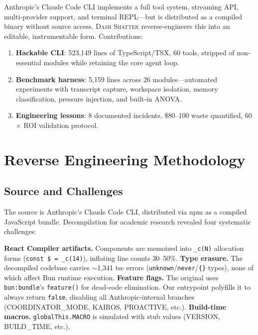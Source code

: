 \documentclass[10pt,a4paper]{article}
\begin{document}
Anthropic's Claude Code CLI implements a full tool system, streaming API, multi-provider support, and terminal REPL---but is distributed as a compiled binary without source access. \textsc{Dash Shatter} reverse-engineers this into an editable, instrumentable form. Contributions:
\begin{enumerate}[leftmargin=1.5em,itemsep=1pt,topsep=2pt]
  \item \textbf{Hackable CLI}: 523{,}149 lines of TypeScript/TSX, 60 tools, stripped of non-essential modules while retaining the core agent loop.
  \item \textbf{Benchmark harness}: 5{,}159 lines across 26 modules---automated experiments with transcript capture, workspace isolation, memory classification, pressure injection, and built-in ANOVA.
  \item \textbf{Engineering lessons}: 8 documented incidents, \$80--100 waste quantified, 60$\times$ ROI validation protocol.
\end{enumerate}

\section{Reverse Engineering Methodology}\label{sec:reverse}

\subsection{Source and Challenges}

The source is Anthropic's Claude Code CLI, distributed via npm as a compiled JavaScript bundle. Decompilation for academic research revealed four systematic challenges:

\textbf{React Compiler artifacts.} Components are memoized into \texttt{\_c(N)} allocation forms (\texttt{const \$ = \_c(14)}), inflating line counts 30--50\%.
\textbf{Type erasure.} The decompiled codebase carries $\sim$1{,}341 tsc errors (\texttt{unknown}/\texttt{never}/\texttt{\{\}} types), none of which affect Bun runtime execution.
\textbf{Feature flags.} The original uses \texttt{bun:bundle}'s \texttt{feature()} for dead-code elimination. Our entrypoint polyfills it to always return \texttt{false}, disabling all Anthropic-internal branches (COORDINATOR\_MODE, KAIROS, PROACTIVE, etc.).
\textbf{Build-time macros.} \texttt{globalThis.MACRO} is simulated with stub values (VERSION, BUILD\_TIME, etc.).
\end{document}
